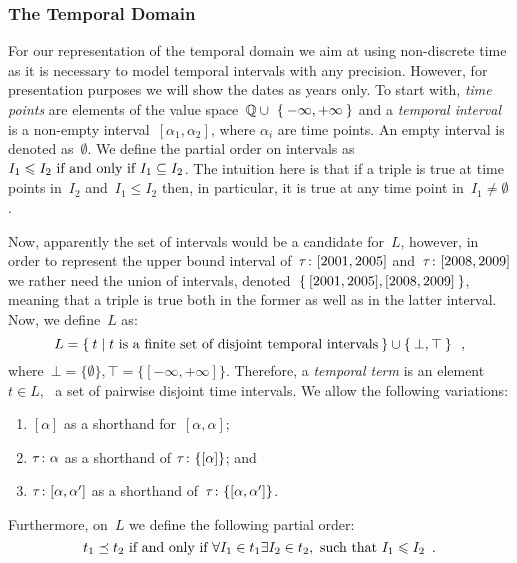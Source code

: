 \subsubsection{The Temporal Domain}
\label{sec:temporal}


For our representation of the temporal domain we aim at using non-discrete time as it is necessary to model temporal
intervals with any precision.
% 
However, for presentation purposes we will show the dates as years only.
%
To start with, \emph{time points} are elements of the value space~$\mathbb{Q} \cup\ \set{-\infty, +\infty}$ and a
\emph{temporal interval} is a non-empty interval~$[\alpha_1, \alpha_2]$, where $\alpha_{i}$ are time points.  An empty
interval is denoted as~$\emptyset$.
%
We define the partial order on intervals as~$I_{1} \leq I_{2} \mbox{ \iff\ } I_{1} \subseteq I_{2}$.  The intuition here
is that if a triple is true at time points in~$I_{2}$ and~$I_{1} \leq I_{2}$ then, in particular, it is true at any time
point in~$I_{1} \neq \emptyset$.

Now, apparently the set of intervals would be a candidate for~$L$, however, in order to represent the upper bound
interval of~$\fuzzyg{\tau}{[2001,2005]}$ and~$\fuzzyg{\tau}{[2008,2009]}$ we rather need the union of intervals,
denoted~$\set{[2001,2005], [2008,2009]}$, meaning that a triple is true both in the former as well as in the latter
interval.
%
Now, we define~$L$ as:
%
\[
L = \set{t \mid t \mbox{ is a finite set of disjoint temporal intervals} } \cup \set{\bot,\top} \enspace ,
\]
%
where~$\bot = \{\emptyset\}, \top = \{[-\infty,+\infty]\}$.
%
Therefore, a \emph{temporal term} is an element~$t \in L$, \ie~a set of pairwise disjoint time intervals. 
% 
We allow the following variations:
\begin{enumerate}[noitemsep,label=(\roman*)]
\item $[\alpha]$ as a shorthand for~$[\alpha, \alpha]$;
\item $\fuzzyg{\tau}{\alpha}$ as a shorthand of $\fuzzyg{\tau}{\{[\alpha]\}}$; and
\item $\fuzzyg{\tau}{[\alpha, \alpha']}$ as a shorthand of~$\fuzzyg{\tau}{\{[\alpha, \alpha']\}}$.
\end{enumerate}
%
Furthermore, on~$L$ we define the following partial order:
\[
t_1 \preceq t_2 \mbox{ \iff }~ \forall I_{1} \in t_1 \exists I_2 \in t_2, \mbox{ such that } I_1 \leq I_2 \enspace .
\]
%
\noindent 
%
\begin{comment}
  \todo{check pre-order vs partial order} 
  Please note that~$\preceq$ is the Hoare order on power sets~\cite{AbramskyJung:1994aa}, which is a pre-order.
  For the anti-symmetry property, assume that~$t_1 \preceq t_2$ and~$t_2 \preceq t_1$: so for an~$I_{1} \in t_{1}$,
  there is $I_{2} \in t_{2}$ for which there is~$I_{3} \in t_{1}$ such that~$I_{1} \subseteq I_{2} \subseteq I_{3}$.
  But,~$t_{1}$ is maximal and, thus,~$I_{1} = I_{3} = I_{2}$. So,~$t_{1} = t_{2}$ and, thus,~$\preceq$ is a partial
  order.
\end{comment}

